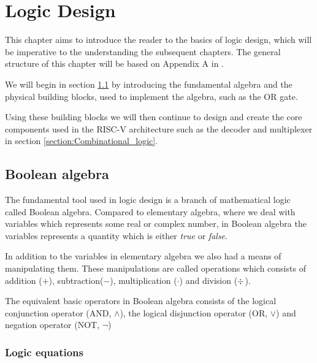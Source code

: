 \chapter{Logic Design}

This chapter aims to introduce the reader to the basics of logic design, which will be imperative to the understanding the subsequent chapters. The general structure of this chapter will be based on Appendix A in \cite{riscVbook}. 

We will begin in section \ref{section:Boolean_algebra} by introducing the fundamental algebra and the physical building blocks, used to implement the algebra, such as the OR gate. 

Using these building blocks we will then continue to design and create the core components used in the RISC-V architecture such as the decoder and multiplexer in section \ref{section:Combinational_logic}. 

\section{Boolean algebra}\label{section:Boolean_algebra}

    The fundamental tool used in logic design is a branch of mathematical logic called Boolean algebra. Compared to elementary algebra, where we deal with variables which represents some real or complex number, in Boolean algebra the variables represents a quantity which is either \textit{true} or \textit{false}.
    
    In addition to the variables in elementary algebra we also had a means of manipulating them. These manipulations are called operations which consists of addition ($+$), subtraction($-$), multiplication ($\cdot$) and division ($ \divisionsymbol $).
    
    The equivalent basic operators in Boolean algebra consists of the logical conjunction operator (AND, $\wedge$), the logical disjunction operator (OR, $\vee$) and negation operator (NOT, $\neg$) 
    
    
    
    
    \subsection{Logic equations}
    
